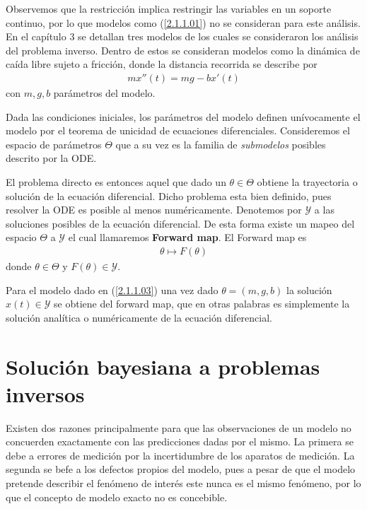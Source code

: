 Observemos que la restricción implica restringir las variables en un soporte continuo, por lo que modelos como (\ref{2.1.1.01}) no se consideran para este análisis. En el capítulo 3 se detallan tres modelos de los cuales se consideraron los análisis del problema inverso. Dentro de estos se consideran modelos como la dinámica de caída libre sujeto a fricción, donde la distancia recorrida se describe por
\begin{align}
    mx''(t) = mg - bx'(t)
    \label{2.1.1.03}
\end{align}
con $m, g, b$ parámetros del modelo.

Dada las condiciones iniciales, los parámetros del modelo definen unívocamente el modelo por el teorema de unicidad de ecuaciones diferenciales. Consideremos el espacio de parámetros $\Theta$ que a su vez es la familia de \textit{submodelos} posibles descrito por la ODE. 


El problema directo es entonces aquel que dado un $\theta \in \Theta$ obtiene la trayectoria o solución de la ecuación diferencial. Dicho problema esta bien definido, pues resolver la ODE es posible al menos numéricamente. Denotemos por $\mathcal{Y}$ a las soluciones posibles de la ecuación diferencial. De esta forma existe un mapeo del espacio $\Theta$ a $\mathcal{Y}$ el cual llamaremos \textbf{Forward map}. El Forward map es 
\begin{align*}
    \theta \mapsto F(\theta) 
\end{align*}
donde $\theta \in \Theta$ y $F(\theta) \in \mathcal{Y}$.

Para el modelo dado en (\ref{2.1.1.03}) una vez dado $\theta = (m,g,b)$ la solución $x(t) \in \mathcal{Y}$ se obtiene del forward map, que en otras palabras es simplemente la solución analítica o numéricamente de la ecuación diferencial.

\section{Solución bayesiana a  problemas inversos}


Existen dos razones principalmente para que las observaciones de un modelo no concuerden exactamente con las predicciones dadas por el mismo. La primera se debe a errores de medición por la incertidumbre de los aparatos de medición. La segunda se befe a los defectos propios del modelo, pues a pesar de que el modelo pretende describir el fenómeno de interés este nunca es el mismo fenómeno, por lo que el concepto de modelo exacto no es concebible.


